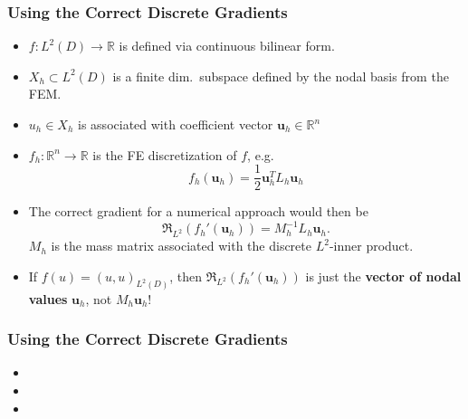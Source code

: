 \documentclass[aspectratio=169,xcolor=dvipsnames,10pt]{beamer}
\begin{document}
\begin{frame}\frametitle{Using the Correct Discrete Gradients}
\vspace{-2ex}
\begin{example}[]
\begin{itemize}
\item
$f : L^2(D) \to \mathbb R$  is defined via continuous bilinear form.
\item 
$X_h \subset L^2(D)$ is a finite dim.\ subspace defined by the nodal basis from the FEM. 
\item 
$u_h \in X_h$ is associated with coefficient vector $\mathbf{u}_h \in \mathbb R^n$ \pause
\item 
$f_h : \mathbb R^n \to \mathbb R$ is the FE discretization of $f$, e.g.
\[
f_h(\mathbf{u}_h) = \frac{1}{2} \mathbf{u}^T_h L_h \mathbf{u}_h
\]
\item The correct gradient for a numerical approach would then be
\[
\mathfrak{R}_{L^2}(f_h'(\mathbf{u}_h)) = M_h^{-1} L_h \mathbf{u}_h.
\]
$M_h$ is the mass matrix associated with the discrete $L^2$-inner product.
\item If $f(u) = (u,u)_{L^2(D)}$, then $\mathfrak{R}_{L^2}(f_h'(\mathbf{u}_h))$ is just the \textbf{vector of nodal values} $\bm u_h$, \alert{not} $M_h \bm u_h$!
\end{itemize}
\end{example}
\end{frame}

\begin{frame}\frametitle{Using the Correct Discrete Gradients}
\begin{example}[]
\begin{itemize}
\item {}
\item {}
\item {}
\end{itemize}
\end{example}
\end{frame}
\end{document}
